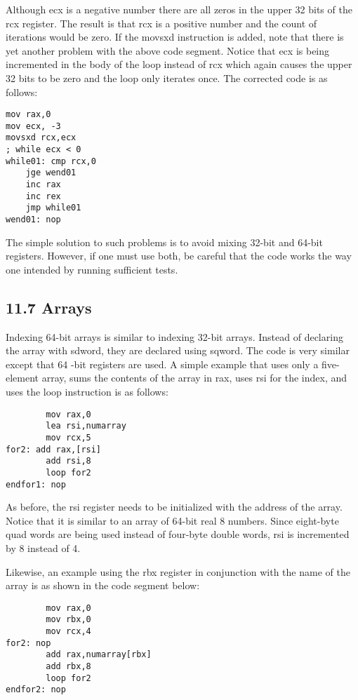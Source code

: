 \documentclass[10pt]{article}
\begin{document}
Although ecx is a negative number there are all zeros in the upper 32 bits of the rcx register. The result is that rcx is a positive number and the count of iterations would be zero. If the movsxd instruction is added, note that there is yet another problem with the above code segment. Notice that ecx is being incremented in the body of the loop instead of rcx which again causes the upper 32 bits to be zero and the loop only iterates once. The corrected code is as follows:

\begin{verbatim}
mov rax,0
mov ecx, -3
movsxd rcx,ecx
; while ecx < 0
while01: cmp rcx,0
    jge wend01
    inc rax
    inc rex
    jmp while01
wend01: nop
\end{verbatim}

The simple solution to such problems is to avoid mixing 32-bit and 64-bit registers. However, if one must use both, be careful that the code works the way one intended by running sufficient tests.

\subsection*{11.7 Arrays}
Indexing 64-bit arrays is similar to indexing 32-bit arrays. Instead of declaring the array with sdword, they are declared using sqword. The code is very similar except that 64 -bit registers are used. A simple example that uses only a five-element array, sums the contents of the array in rax, uses rsi for the index, and uses the loop instruction is as follows:

\begin{verbatim}
        mov rax,0
        lea rsi,numarray
        mov rcx,5
for2: add rax,[rsi]
        add rsi,8
        loop for2
endfor1: nop
\end{verbatim}

As before, the rsi register needs to be initialized with the address of the array. Notice that it is similar to an array of 64-bit real 8 numbers. Since eight-byte quad words are being used instead of four-byte double words, rsi is incremented by 8 instead of 4.

Likewise, an example using the rbx register in conjunction with the name of the array is as shown in the code segment below:

\begin{verbatim}
        mov rax,0
        mov rbx,0
        mov rcx,4
for2: nop
        add rax,numarray[rbx]
        add rbx,8
        loop for2
endfor2: nop
\end{verbatim}
\end{document}
